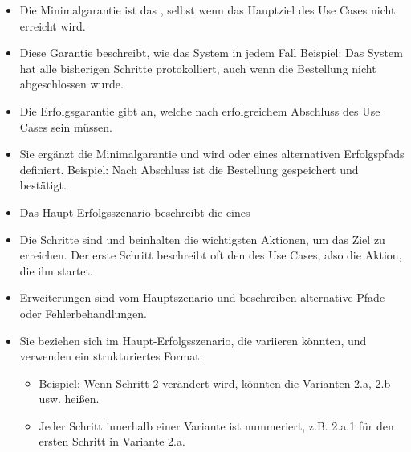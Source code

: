 \begin{infoBox}[title=Minimal Guarantee (Minimale Garantie)]
    \begin{itemize}
        \item Die Minimalgarantie ist das , selbst wenn das Hauptziel des Use Cases nicht erreicht wird.
        \item Diese Garantie beschreibt, wie das System in jedem Fall  Beispiel: Das System hat alle bisherigen Schritte protokolliert, auch wenn die Bestellung nicht abgeschlossen wurde.
    \end{itemize}
\end{infoBox}
\begin{infoBox}[title=Success Guarantee (Erfolgsgarantie)]
    \begin{itemize}
        \item Die Erfolgsgarantie gibt an, welche  nach erfolgreichem Abschluss des Use Cases  sein müssen.
        \item Sie ergänzt die Minimalgarantie und wird  oder eines alternativen Erfolgspfads definiert. Beispiel: Nach Abschluss ist die Bestellung gespeichert und bestätigt.
    \end{itemize}
\end{infoBox}
\begin{infoBox}[title=Main Success Scenario (Haupt-Erfolgsszenario)]
    \begin{itemize}
        \item Das Haupt-Erfolgsszenario beschreibt die  eines 
        \item Die Schritte sind  und beinhalten die wichtigsten Aktionen, um das Ziel zu erreichen. Der erste Schritt beschreibt oft den  des Use Cases, also die Aktion, die ihn startet.
    \end{itemize}
\end{infoBox}
\begin{infoBox}[title=Extensions (Erweiterungen)]
    \begin{itemize}
        \item Erweiterungen sind  vom Hauptszenario und beschreiben alternative Pfade oder Fehlerbehandlungen.
        \item Sie beziehen sich  im Haupt-Erfolgsszenario, die variieren könnten, und verwenden ein strukturiertes Format:
        \begin{itemize}
            \item Beispiel: Wenn Schritt 2 verändert wird, könnten die Varianten 2.a, 2.b usw. heißen.
            \item Jeder Schritt innerhalb einer Variante ist nummeriert, z.B. 2.a.1 für den ersten Schritt in Variante 2.a.
        \end{itemize}
    \end{itemize}
\end{infoBox}
